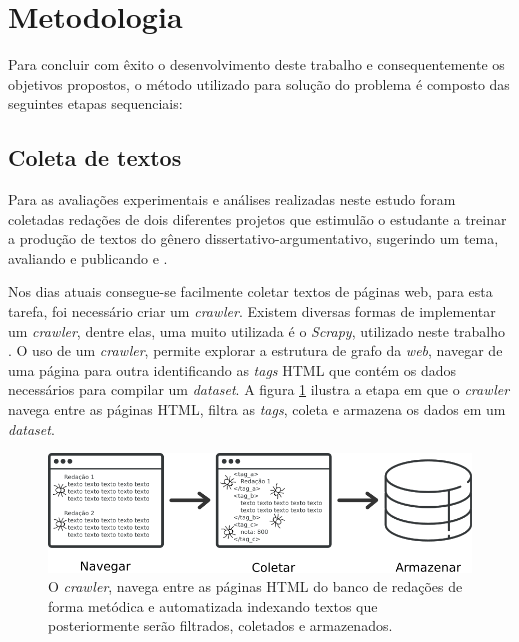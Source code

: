 \section{Metodologia}

Para concluir com êxito o desenvolvimento deste trabalho e consequentemente os 
objetivos propostos, o método utilizado para solução do problema é composto das 
seguintes etapas sequenciais:

\subsection{Coleta de textos}

Para as avaliações experimentais e análises realizadas neste estudo foram 
coletadas redações de dois diferentes projetos que estimulão o estudante a 
treinar a produção de textos do gênero dissertativo-argumentativo, sugerindo 
um tema, avaliando e publicando \cite{brasil_escola} e \cite{uol:2017}. 

Nos dias atuais consegue-se facilmente coletar textos de páginas web, para esta 
tarefa, foi necessário criar um  \textit{crawler}. Existem diversas formas de 
implementar um \textit{crawler}, dentre elas, uma muito utilizada é o 
\textit{Scrapy}, utilizado neste trabalho \cite{scrapy}. O uso de um 
\textit{crawler}, permite explorar a estrutura de grafo da \textit{web}, 
navegar de uma página para outra identificando as \textit{tags} HTML que contém 
os dados necessários para compilar um \textit{dataset}. A figura 
\ref{figure:metodologia_1} ilustra a etapa em que o \textit{crawler} navega 
entre as páginas HTML, filtra as \textit{tags}, coleta e armazena os dados em 
um \textit{dataset}.

\begin{figure}[H]
\begin{center}
    \includegraphics[scale=0.70]{images/metodologia_1.png}
\end{center}
\caption{O \textit{crawler}, navega entre as páginas HTML do banco de redações 
de forma metódica e automatizada indexando textos que posteriormente serão 
filtrados, coletados e armazenados.}
\label{figure:metodologia_1}
\end{figure}

